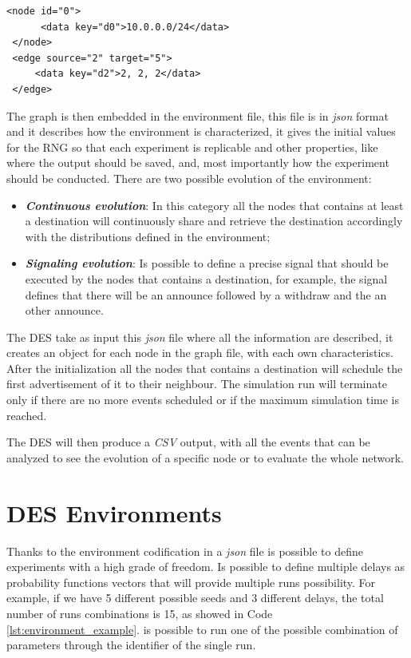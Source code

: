 \begin{lstlisting}[language=graphml, caption=Graph example, label=lst:graph_example]
 <node id="0">
      <data key="d0">10.0.0.0/24</data>
 </node>
 <edge source="2" target="5">                                                  
     <data key="d2">2, 2, 2</data>                                             
 </edge> 
\end{lstlisting}

The graph is then embedded in the environment file, this file is in \textit{json}
format and it describes how the environment is characterized, it gives the
initial values for the \ac{RNG} so that each experiment is replicable and
other properties, like where the output should be saved, and, most importantly
how the experiment should be conducted.
There are two possible evolution of the environment:
\begin{itemize}
    \item \textbf{\textit{Continuous evolution}}: In this category all the nodes
    that contains at least a destination will continuously share and retrieve
    the destination accordingly with the distributions defined in the environment;
    \item \textbf{\textit{Signaling evolution}}: Is possible to define a precise
    signal that should be executed by the nodes that contains a destination, for 
    example, the signal  defines that there will be an announce followed by 
    a withdraw and the an other announce.
\end{itemize}

The \ac{DES} take as input this \textit{json} file where all the information
are described, it creates an object for each node in the graph file, with
each own characteristics.
After the initialization all the nodes that contains a destination will schedule
the first advertisement of it to their neighbour.
The simulation run will terminate only if there are no more events scheduled or
if the maximum simulation time is reached.

The \ac{DES} will then produce a \textit{CSV} output, with all the events that 
can be analyzed to see the evolution of a specific node or to evaluate the
whole network.
 
\section{DES Environments}
\label{sec:des_environment}

Thanks to the environment codification in a \textit{json} file is possible to
define experiments with a high grade of freedom.
Is possible to define multiple delays as probability functions vectors that
will provide multiple runs possibility. For example, if we have \num{5} different
possible seeds and \num{3} different delays, the total number of runs combinations
is \num{15}, as showed in Code \ref{lst:environment_example}.
is possible to run one of the possible combination of parameters through the identifier
of the single run.

